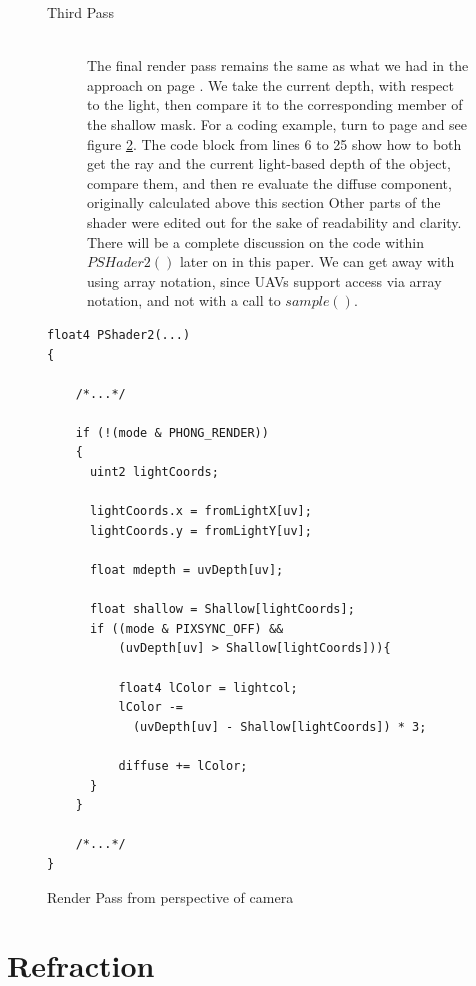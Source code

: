 \documentclass[a4paper, 12pt]{article}
\begin{document}
\begin{figure}[h!]
\begin{description}
\item[Third Pass] \hfill \\ 

The final render pass remains the same as what we had in the approach on page
\pageref{section:DepthMap}. We take the current depth, with respect to the
light, then compare it to the corresponding member of the shallow mask. For a
coding example, turn to page \pageref{code:PSDepthRender} and see figure
\ref{code:PSDepthRender}. The code block from lines 6 to 25 show how to both
get the ray and the current light-based depth of the object, compare them, and
then re evaluate the diffuse component, originally calculated above this
section Other parts of the shader were edited out for the sake of readability
and clarity. There will be a complete discussion on the code within
$PSHader2()$ later on in this paper. We can get away with using array
notation, since UAVs support access via array notation, and not with a call to
$sample()$.

\end{description}
\label{figure:PSDesc}
\end{figure}

\begin{figure}[h]
\begin{lstlisting}[breaklines=true,language=HLSL]
float4 PShader2(...)
{

	/*...*/

	if (!(mode & PHONG_RENDER))
	{
	  uint2 lightCoords;

	  lightCoords.x = fromLightX[uv];
	  lightCoords.y = fromLightY[uv];

	  float mdepth = uvDepth[uv];

	  float shallow = Shallow[lightCoords];
	  if ((mode & PIXSYNC_OFF) && 
	      (uvDepth[uv] > Shallow[lightCoords])){
		  
		  float4 lColor = lightcol;
		  lColor -= 
		    (uvDepth[uv] - Shallow[lightCoords]) * 3;
			
		  diffuse += lColor;
	  }
	}

	/*...*/
}
\end{lstlisting}

\caption{Render Pass from perspective of camera}
\label{code:PSDepthRender}
\end{figure}

\pagebreak

\section{Refraction}
\end{document}
